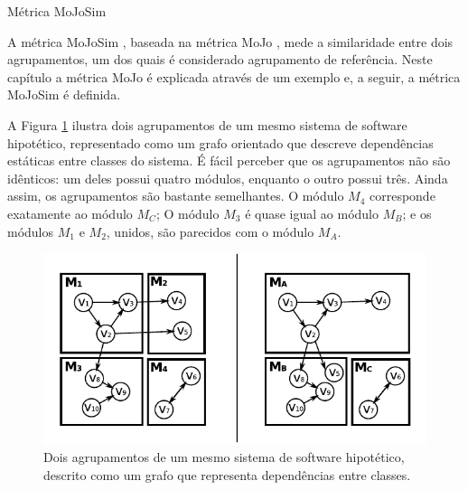 \begin{chapter}{Métrica MoJoSim} \label{cap:mojosim}

A métrica MoJoSim \cite{Bittencourt2009}, baseada na métrica MoJo \cite{Tzerpos1999}, mede a similaridade entre dois agrupamentos, um dos quais é considerado agrupamento de referência. Neste capítulo a métrica MoJo é explicada através de um exemplo e, a seguir, a métrica MoJoSim é definida.


A Figura \ref{fig:mojo} ilustra dois agrupamentos de um mesmo sistema de software hipotético, representado como um grafo orientado que descreve dependências estáticas entre classes do sistema. É fácil perceber que os agrupamentos não são idênticos: um deles possui quatro módulos, enquanto o outro possui três. Ainda assim, os agrupamentos são bastante semelhantes. O módulo $M_4$ corresponde exatamente ao módulo $M_C$; O módulo $M_3$ é quase igual ao módulo $M_B$; e os módulos $M_1$ e $M_2$, unidos, são parecidos com o módulo $M_A$.

\begin{figure}[htbp]
	\centering
		\includegraphics[scale=1]{figuras/redes-dupla}
	\caption{Dois agrupamentos de um mesmo sistema de software hipotético, descrito como um grafo que representa dependências entre classes.}
	\label{fig:mojo}
\end{figure}



\end{chapter}
